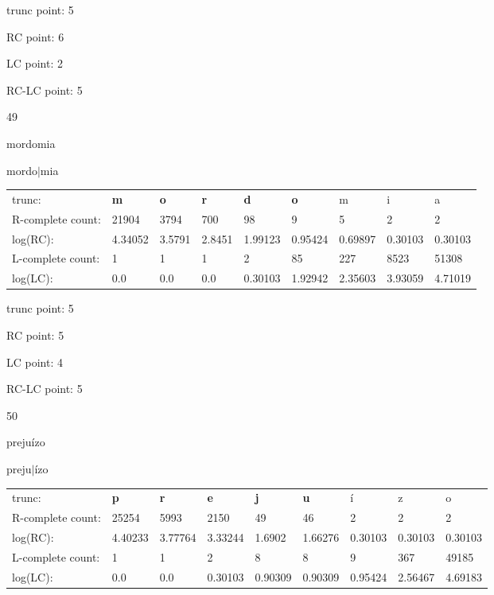 \documentclass{article}
\begin{document}
trunc point: 5

RC point: 6

LC point: 2

RC-LC point: 5

\vspace{3em}



49

mordomia

mordo$|$mia

\vspace{1em}

\begin{tabular}{l|llllllll}

trunc: & {\color{red}\bf m} & {\color{red}\bf o} & {\color{red}\bf r} & {\color{red}\bf d} & {\color{red}\bf o} & m & i & a \\ 
R-complete count: & 21904 & 3794 & 700 & 98 & 9 & 5 & 2 & 2 \\ 
log(RC): & 4.34052 & 3.5791 & 2.8451 & 1.99123 & 0.95424 & 0.69897 & 0.30103 & 0.30103 \\ 
L-complete count: & 1 & 1 & 1 & 2 & 85 & 227 & 8523 & 51308 \\ 
log(LC): & 0.0 & 0.0 & 0.0 & 0.30103 & 1.92942 & 2.35603 & 3.93059 & 4.71019 \\ 
\end{tabular}

trunc point: 5

RC point: 5

LC point: 4

RC-LC point: 5

\vspace{3em}



50

prejuízo

preju$|$ízo

\vspace{1em}

\begin{tabular}{l|llllllll}

trunc: & {\color{red}\bf p} & {\color{red}\bf r} & {\color{red}\bf e} & {\color{red}\bf j} & {\color{red}\bf u} & í & z & o \\ 
R-complete count: & 25254 & 5993 & 2150 & 49 & 46 & 2 & 2 & 2 \\ 
log(RC): & 4.40233 & 3.77764 & 3.33244 & 1.6902 & 1.66276 & 0.30103 & 0.30103 & 0.30103 \\ 
L-complete count: & 1 & 1 & 2 & 8 & 8 & 9 & 367 & 49185 \\ 
log(LC): & 0.0 & 0.0 & 0.30103 & 0.90309 & 0.90309 & 0.95424 & 2.56467 & 4.69183 \\ 
\end{tabular}
\end{document}
